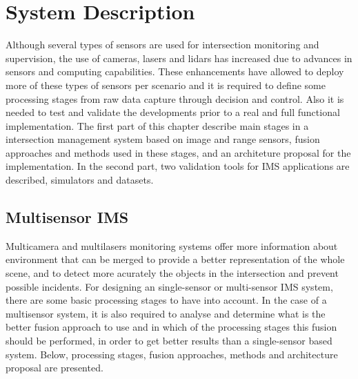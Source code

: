 
\chapter {System Description}

Although several types of sensors are used for intersection monitoring and supervision, the use of cameras, lasers and lidars has increased due to advances in sensors and computing capabilities. These enhancements have allowed to deploy more of these types of sensors per scenario and it is required to define some processing stages from raw data capture through decision and control. Also it is needed to test and validate the developments prior to a real and full functional implementation. The first part of this chapter describe main stages in a intersection management system based on image and range sensors, fusion approaches and methods used in these stages, and an architeture proposal for the implementation. In the second part, two validation tools for IMS applications are described, simulators and datasets.

\section{Multisensor IMS}

Multicamera and multilasers monitoring systems offer more information about environment that can be merged to provide a better representation of the whole scene, and to detect more acurately the objects in the intersection and prevent possible incidents. For designing an single-sensor or multi-sensor IMS system, there are some basic processing stages to have into account. In the case of a multisensor system, it is also required to analyse and determine what is the better fusion approach to use and in which of the processing stages this fusion should be performed, in order to get better results than a single-sensor based system. Below, processing stages, fusion approaches, methods and architecture proposal are presented.

